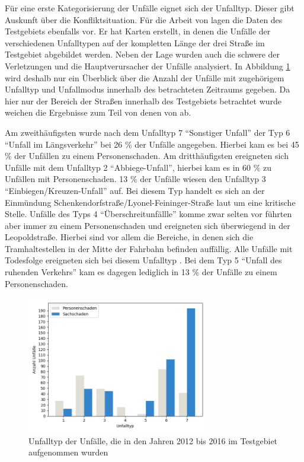 Für eine erste Kategorisierung der Unfälle eignet sich der Unfalltyp. Dieser gibt Auskunft über die Konfliktsituation. Für die Arbeit von \Textcite[S. 16-33]{Bruhn.2018} lagen die Daten des Testgebiets ebenfalls vor. Er hat Karten erstellt, in denen die Unfälle der verschiedenen Unfalltypen auf der kompletten Länge der drei Straße im Testgebiet abgebildet werden. Neben der Lage wurden auch die schwere der Verletzungen und die Hauptverursacher der Unfälle analysiert. In Abbildung \ref{fig:Unfalltyp} wird deshalb nur ein Überblick über die  Anzahl der Unfälle mit zugehörigem Unfalltyp und Unfallmodus innerhalb des betrachteten Zeitraums gegeben. Da hier nur der Bereich der Straßen innerhalb des Testgebiets betrachtet wurde weichen die Ergebnisse zum Teil von denen von \Textcite[S. 16-33]{Bruhn.2018} ab. 

Am zweithäufigsten wurde nach dem Unfalltyp 7 \enquote{Sonstiger Unfall} der Typ 6 \enquote{Unfall im Längsverkehr} bei 26 \% der Unfälle angegeben. Hierbei kam es bei 45 \% der Unfällen zu einem Personenschaden. Am dritthäufigsten ereigneten sich Unfälle mit dem Unfalltyp 2 \enquote{Abbiege-Unfall}, hierbei kam es in 60 \% zu Unfällen mit Personenschaden. 13 \% der Unfälle wiesen den Unfalltyp 3 \enquote{Einbiegen/Kreuzen-Unfall} auf. Bei diesem Typ handelt es sich an der Einmündung Schenkendorfstraße/Lyonel-Feininger-Straße laut \Textcite[S. 23]{Bruhn.2018} um eine kritische Stelle. Unfälle des Typs 4 \enquote{Überschreitunfällle} komme zwar selten vor führten aber immer zu einem Personenschaden und ereigneten sich überwiegend in der Leopoldstraße. Hierbei sind vor allem die Bereiche, in denen sich die Tramhaltestellen in der Mitte der Fahrbahn befinden auffällig. Alle Unfälle mit Todesfolge ereigneten sich bei diesem Unfalltyp \parencite[S. 26f]{Bruhn.2018}. Bei dem Typ 5 \enquote{Unfall des ruhenden Verkehrs} kam es dagegen lediglich in 13 \% der Unfälle zu einem Personenschaden.

\begin{savenotes}
	\begin{figure}[H]
		\centering
		\includegraphics[width=8cm,height=6cm]{figures/Unfalltyp}
		\caption[Unfalltyp der Unfälle, die in den Jahren 2012 bis 2016 im Testgebiet aufgenommen wurden]{Unfalltyp der Unfälle, die in den Jahren 2012 bis 2016 im Testgebiet aufgenommen wurden}\label{fig:Unfalltyp}
	\end{figure}
\end{savenotes}

